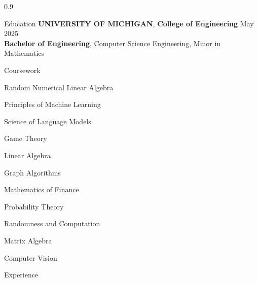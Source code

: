 \documentclass{resume} %
\begin{document}
\begin{spacing}{0.9}

\vspace{-0.5em}


\begin{rSection}{Education}
{\bf UNIVERSITY OF MICHIGAN}, {\bf College of Engineering} \hfill {May 2025}\\
{\bf Bachelor of Engineering}, Computer Science Engineering, Minor in Mathematics
\end{rSection}
\vspace{-0.75em}


\begin{rSection}{Coursework}
\vspace{-0.25em}
\begin{inparaitem}
    \item Random Numerical Linear Algebra
    \item Principles of Machine Learning
    \item Science of Language Models
    \item Game Theory
    \item Linear Algebra
\end{inparaitem}
\vspace{-0.5em}

\begin{inparaitem}
    \item Graph Algorithms
    \item Mathematics of Finance
    \item Probability Theory
    \item Randomness and Computation
    \item Matrix Algebra
    \item Computer Vision 
\end{inparaitem}
\end{rSection}
\vspace{-0.75em}


\begin{rSection}{Experience}
\vspace{-0.5em}



\end{rSection}
\end{spacing}
\end{document}

